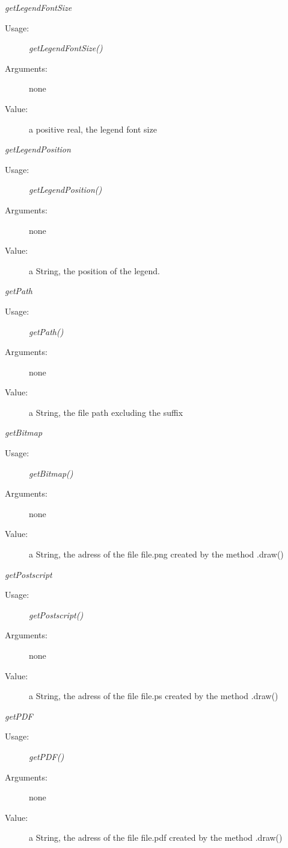\begin{description}
\begin{description}
  \item \textit{getLegendFontSize}
    \begin{description}
    \item[Usage:] \textit{getLegendFontSize()}
    \item[Arguments:] none
    \item[Value:] a positive real, the legend font size
    \end{description}
    \bigskip

  \item \textit{getLegendPosition}
    \begin{description}
    \item[Usage:] \textit{getLegendPosition()}
    \item[Arguments:] none
    \item[Value:] a String, the position of the legend.
    \end{description}
    \bigskip

  \item \textit{getPath}
    \begin{description}
    \item[Usage:] \textit{getPath()}
    \item[Arguments:] none
    \item[Value:] a String, the file path excluding the suffix
    \end{description}
    \bigskip

  \item \textit{getBitmap}
    \begin{description}
    \item[Usage:] \textit{getBitmap()}
    \item[Arguments:] none
    \item[Value:] a String, the adress of the file file.png created by the method .draw()
    \end{description}
    \bigskip

  \item \textit{getPostscript}
    \begin{description}
    \item[Usage:] \textit{getPostscript()}
    \item[Arguments:] none
    \item[Value:] a String, the adress of the file file.ps created by the method .draw()
    \end{description}
    \bigskip

  \item \textit{getPDF}
    \begin{description}
    \item[Usage:] \textit{getPDF()}
    \item[Arguments:] none
    \item[Value:] a String, the adress of the file file.pdf created by the method .draw()
    \end{description}
    \bigskip


\end{description}
\end{description}
